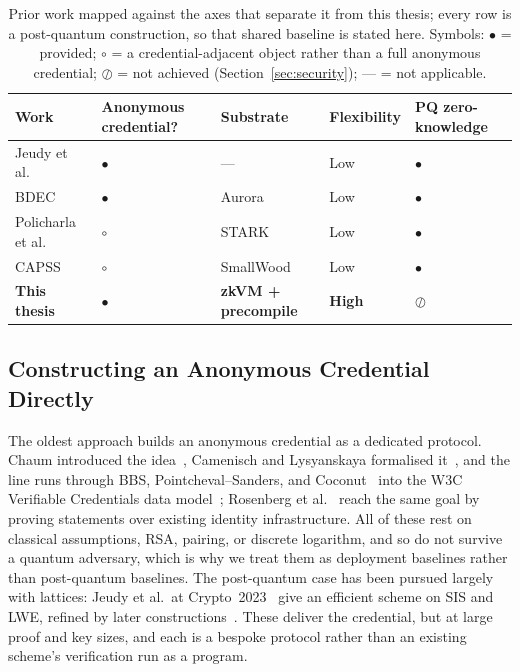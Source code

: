 \begin{table}[H]
\centering\small \setlength{\tabcolsep}{5pt} \renewcommand{\arraystretch}{1.2}
\begin{tabular}{@{}p{2.5cm}>{\centering\arraybackslash}p{1.9cm}p{3cm}>{\centering\arraybackslash}p{1.5cm}|>{\centering\arraybackslash}p{1.9cm}@{}}
\hline
\textbf{Work} & \textbf{Anonymous credential?} & \textbf{Substrate} & \textbf{Flexibility} & \textbf{PQ zero-knowledge} \\ \hline
Jeudy et al.~\cite{jeudy2023lattice} & $\bullet$ & --- & Low & $\bullet$ \\
BDEC~\cite{10.1007/978-981-96-0957-4_3} & $\bullet$ & Aurora & Low & $\bullet$ \\
Policharla et al.~\cite{policharla2023pqprivacypass} & $\circ$ & STARK & Low & $\bullet$ \\
CAPSS~\cite{feneuil2025capss} & $\circ$ & SmallWood & Low & $\bullet$ \\ \hline
\textbf{This thesis} & $\bullet$ & \textbf{zkVM + precompile} & \textbf{High} & $\oslash$ \\ \hline
\end{tabular}
\caption{Prior work mapped against the axes that separate it from this thesis; every row is a post-quantum construction, so that shared baseline is stated here. Symbols: $\bullet$ = provided; $\circ$ = a credential-adjacent object rather than a full anonymous credential; $\oslash$ = not achieved (Section~\ref{sec:security}); --- = not applicable. \label{tab:positioning}}
\end{table}

\subsection{Constructing an Anonymous Credential Directly}
The oldest approach builds an anonymous credential as a dedicated protocol. Chaum introduced the idea~\cite{chaum1985}, Camenisch and Lysyanskaya formalised it~\cite{camenisch2004signatures}, and the line runs through BBS, Pointcheval--Sanders, and Coconut~\cite{bbs04,pointchevalsanders2016,sonnino2019coconut} into the W3C Verifiable Credentials data model~\cite{w3cvc}; Rosenberg et al.~\cite{rosenberg2023zkcreds} reach the same goal by proving statements over existing identity infrastructure. All of these rest on classical assumptions, RSA, pairing, or discrete logarithm, and so do not survive a quantum adversary, which is why we treat them as deployment baselines rather than post-quantum baselines. The post-quantum case has been pursued largely with lattices: Jeudy et al.\ at Crypto~2023~\cite{jeudy2023lattice} give an efficient scheme on SIS and LWE, refined by later constructions~\cite{BootleLNS23,ArgoGJLRS24}. These deliver the credential, but at large proof and key sizes, and each is a bespoke protocol rather than an existing scheme's verification run as a program.

